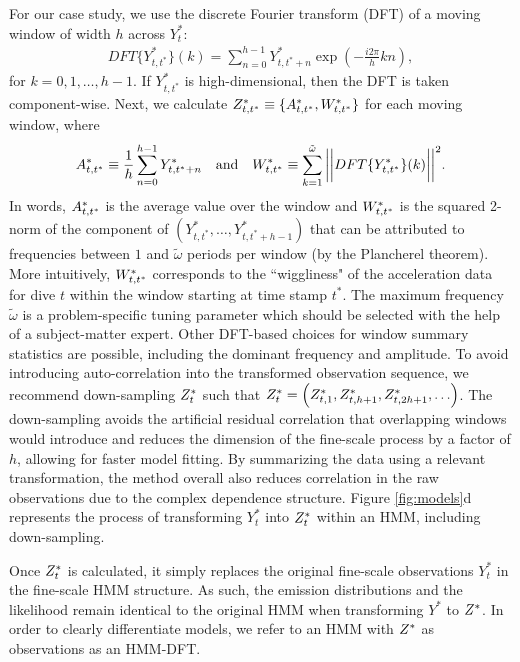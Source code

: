 For our case study, we use the discrete Fourier transform (DFT) of a moving window of width $h$ across $Y^*_t$:
%
\begin{align*}
    DFT\{Y^*_{t,t^*}\}(k) = \sum_{n=0}^{h-1} Y^*_{t,t^*+n}\exp\left(-\frac{i 2\pi}{h} kn \right),
\end{align*}
%
for $k = 0, 1, \ldots, h-1$. If $Y^*_{t,t^*}$ is high-dimensional, then the DFT is taken component-wise. Next, we calculate $Z^*_{t,t^*} \equiv \{A^*_{t,t^*},W^*_{t,t^*}\}$ for each moving window, where
%
\begin{equation}
    \label{eqn:z}
    \Zone_{t,t^*} \equiv \frac{1}{h}\sum_{n=0}^{h-1}Y^*_{t,t^*+n} \quad \text{and} \quad \Ztwo_{t,t^*} \equiv \sum_{k=1}^{\tilde{\omega}}\bigg|\bigg|DFT\{Y^*_{t,t^*}\}(k)\bigg|\bigg|^2.
\end{equation}
%
In words, $A^*_{t,t^*}$ is the average value over the window and $W^*_{t,t^*}$ is the squared 2-norm of the component of $\left(Y^*_{t,t^*}, \ldots, Y^*_{t,t^*+h-1}\right)$ that can be attributed to frequencies between $1$ and $\tilde{\omega}$ periods per window (by the Plancherel theorem). More intuitively, $W^*_{t,t^*}$ corresponds to the ``wiggliness" of the acceleration data for dive $t$ within the window starting at time stamp $t^*$. The maximum frequency $\tilde{\omega}$ is a problem-specific tuning parameter which should be selected with the help of a subject-matter expert. Other DFT-based choices for window summary statistics are possible, including the dominant frequency and amplitude. To avoid introducing auto-correlation into the transformed observation sequence, we recommend down-sampling $Z^*_t$ such that $Z^*_t = \left(Z^*_{t,1},Z^*_{t,h+1},Z^*_{t,2h+1},\ldots\right)$. The down-sampling avoids the artificial residual correlation that overlapping windows would introduce and reduces the dimension of the fine-scale process by a factor of $h$, allowing for faster model fitting. By summarizing the data using a relevant transformation, the method overall also reduces correlation in the raw observations due to the complex dependence structure. Figure \ref{fig:models}d represents the process of transforming $Y^*_{t}$ into $Z^*_{t}$ within an HMM, including down-sampling.

Once $Z^*_t$ is calculated, it simply replaces the original fine-scale observations $Y^*_t$ in the fine-scale HMM structure. As such, the emission distributions and the likelihood remain identical to the original HMM when transforming $Y^*$ to $Z^*$. In order to clearly differentiate models, we refer to an HMM with $Z^*$ as observations as an HMM-DFT.

